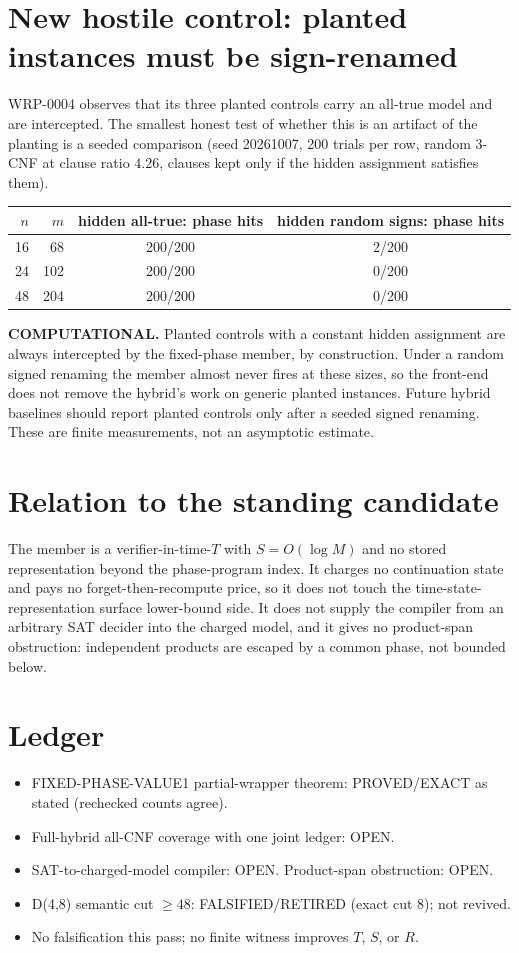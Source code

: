 \documentclass[11pt]{article}
\begin{document}
\section{New hostile control: planted instances must be sign-renamed}
WRP-0004 observes that its three planted controls carry an all-true model and
are intercepted. The smallest honest test of whether this is an artifact of
the planting is a seeded comparison (seed 20261007, 200 trials per row,
random 3-CNF at clause ratio $4.26$, clauses kept only if the hidden
assignment satisfies them).

\begin{center}
\begin{tabular}{rrcc}
\toprule
$n$ & $m$ & hidden all-true: phase hits & hidden random signs: phase hits\\
\midrule
16 & 68 & 200/200 & 2/200\\
24 & 102 & 200/200 & 0/200\\
48 & 204 & 200/200 & 0/200\\
\bottomrule
\end{tabular}
\end{center}

\textbf{COMPUTATIONAL.} Planted controls with a constant hidden assignment are
always intercepted by the fixed-phase member, by construction. Under a random
signed renaming the member almost never fires at these sizes, so the
front-end does not remove the hybrid's work on generic planted instances.
Future hybrid baselines should report planted controls only after a seeded
signed renaming. These are finite measurements, not an asymptotic estimate.

\section{Relation to the standing candidate}
The member is a verifier-in-time-$T$ with $S=O(\log M)$ and no stored
representation beyond the phase-program index. It charges no continuation
state and pays no forget-then-recompute price, so it does not touch the
time-state-representation surface lower-bound side. It does not supply the
compiler from an arbitrary SAT decider into the charged model, and it gives
no product-span obstruction: independent products are escaped by a common
phase, not bounded below.

\section{Ledger}
\begin{itemize}
\item FIXED-PHASE-VALUE1 partial-wrapper theorem: PROVED/EXACT as stated
(rechecked counts agree).
\item Full-hybrid all-CNF coverage with one joint ledger: OPEN.
\item SAT-to-charged-model compiler: OPEN. Product-span obstruction: OPEN.
\item D(4,8) semantic cut $\ge 48$: FALSIFIED/RETIRED (exact cut 8); not revived.
\item No falsification this pass; no finite witness improves $T$, $S$, or $R$.
\end{itemize}
\end{document}
